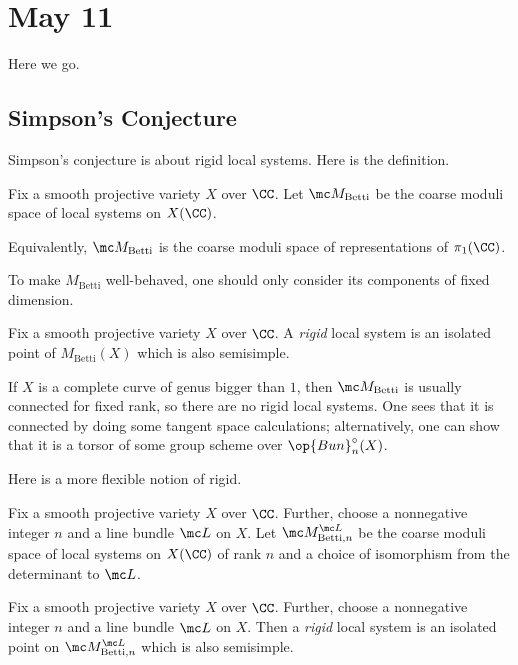 \documentclass[../notes.tex]{subfiles}
\begin{document}
\section{May 11}
Here we go.

\subsection{Simpson's Conjecture}
Simpson's conjecture is about rigid local systems. Here is the definition.
\begin{notation}
	Fix a smooth projective variety $X$ over $\CC$. Let $\mc M_{\mathrm{Betti}}$ be the coarse moduli space of local systems on $X(\CC)$.
\end{notation}
\begin{remark}
	Equivalently, $\mc M_{\mathrm{Betti}}$ is the coarse moduli space of representations of $\pi_1(\CC)$. 
\end{remark}
\begin{remark}
	To make $M_{\mathrm{Betti}}$ well-behaved, one should only consider its components of fixed dimension.
\end{remark}
\begin{definition}[rigid]
	Fix a smooth projective variety $X$ over $\CC$. A \textit{rigid} local system is an isolated point of $M_{\mathrm{Betti}}(X)$ which is also semisimple.
\end{definition}
\begin{example}
	If $X$ is a complete curve of genus bigger than $1$, then $\mc M_{\mathrm{Betti}}$ is usually connected for fixed rank, so there are no rigid local systems. One sees that it is connected by doing some tangent space calculations; alternatively, one can show that it is a torsor of some group scheme over $\op{Bun}_n^\circ(X)$.
\end{example}
Here is a more flexible notion of rigid.
\begin{notation}
	Fix a smooth projective variety $X$ over $\CC$. Further, choose a nonnegative integer $n$ and a line bundle $\mc L$ on $X$. Let $\mc M_{\mathrm{Betti},n}^{\mc L}$ be the coarse moduli space of local systems on $X(\CC)$ of rank $n$ and a choice of isomorphism from the determinant to $\mc L$.
\end{notation}
\begin{definition}[rigid]
	Fix a smooth projective variety $X$ over $\CC$. Further, choose a nonnegative integer $n$ and a line bundle $\mc L$ on $X$. Then a \textit{rigid} local system is an isolated point on $\mc M_{\mathrm{Betti},n}^{\mc L}$ which is also semisimple.
\end{definition}
\end{document}
